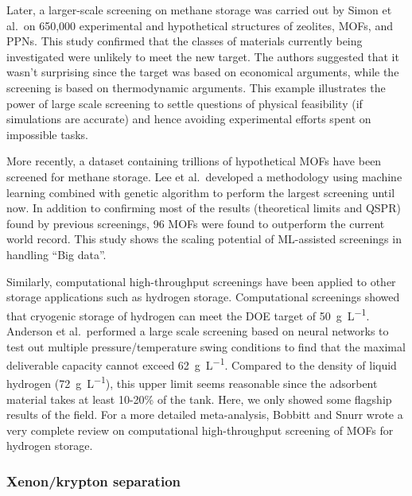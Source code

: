 \documentclass[main.tex]{subfiles}
\begin{document}
Later, a larger-scale screening on methane storage was carried out by Simon et al.\ on 650,000 experimental and hypothetical structures of zeolites, MOFs, and PPNs. This study confirmed that the classes of materials currently being investigated were unlikely to meet the new target. The authors suggested that it wasn't surprising since the target was based on economical arguments, while the screening is based on thermodynamic arguments.\cite{Simon_2015_EES} This example illustrates the power of large scale screening to settle questions of physical feasibility (if simulations are accurate) and hence avoiding experimental efforts spent on impossible tasks.

More recently, a dataset containing trillions of hypothetical MOFs have been screened for methane storage.\cite{Lee_2021} Lee et al.\ developed a methodology using machine learning combined with genetic algorithm to perform the largest screening until now. In addition to confirming most of the results (theoretical limits and QSPR) found by previous screenings, 96 MOFs were found to outperform the current world record. This study shows the scaling potential of ML-assisted screenings in handling ``Big data''.

Similarly, computational high-throughput screenings have been applied to other storage applications such as hydrogen storage. Computational screenings showed that cryogenic storage of hydrogen can meet the DOE target of \SI{50}{\gram\per\liter}.\cite{Gomez_Gualdron_2016, Bobbitt_2016, Thornton_2017} Anderson et al.\ performed a large scale screening based on neural networks to test out multiple pressure/temperature swing conditions to find that the maximal deliverable capacity cannot exceed \SI{62}{\gram\per\liter}.\cite{Anderson_2018} Compared to the density of liquid hydrogen (\SI{72}{\gram\per\liter}), this upper limit seems reasonable since the adsorbent material takes at least {10-20\%} of the tank. Here, we only showed some flagship results of the field. For a more detailed meta-analysis, Bobbitt and Snurr wrote a very complete review on computational high-throughput screening of MOFs for hydrogen storage.\cite{Bobbitt_2019}

\subsubsection{Xenon/krypton separation}
\end{document}

